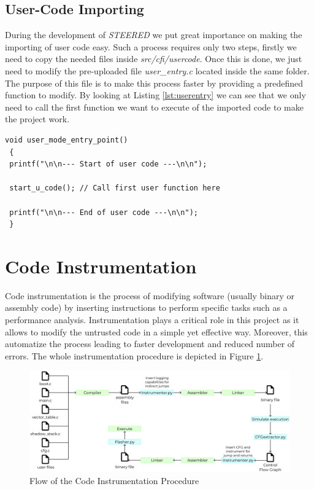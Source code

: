 \subsection{User-Code Importing}
\label{subsec:project_ucodeimport}

During the development of \textit{STEERED} we put great importance on making the
importing of user code easy. Such a process requires only two steps, firstly we need
to copy the needed files inside \textit{src/cfi/usercode}. Once this is done, we
just need to modify the pre-uploaded file \textit{user\_entry.c} located inside the
same folder. The purpose of this file is to make this process faster by
providing a predefined function to modify. By looking at Listing \ref{lst:userentry}
we can see that we only need to call the first function we want to execute of the
imported code to make the project work. \\
\begin{lstlisting}[style=CStyle, caption = \textit{user\_entry.c} File, label={lst:userentry}]
void user_mode_entry_point()
 {
 printf("\n\n--- Start of user code ---\n\n");

 start_u_code(); // Call first user function here

 printf("\n\n--- End of user code ---\n\n");
 }
\end{lstlisting}

\section{Code Instrumentation}
\label{sec:project_instrumentation}

Code instrumentation is the process of modifying software (usually binary or assembly
code) by inserting instructions to perform specific tasks such as a performance
analysis. Instrumentation plays a critical role in this project as it allows to modify
the untrusted code in a simple yet effective way. Moreover, this automatize the process
leading to faster development and reduced number of errors. The whole
instrumentation procedure is depicted in Figure \ref{fig:instrumentation}. \\
\begin{figure}[htbp]
  \centering
  \includegraphics[width=.9\linewidth]{images/instrumentation.png}
  \caption{Flow of the Code Instrumentation Procedure}
  \label{fig:instrumentation}
\end{figure}
\\

